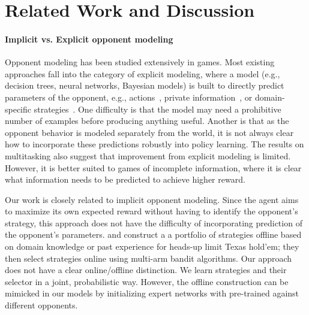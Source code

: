 \section{Related Work and Discussion}
\label{sec:related_work}
\paragraph{Implicit vs. Explicit opponent modeling}

Opponent modeling has been studied extensively in games.  Most existing approaches fall into the category of explicit modeling, where a model (e.g., decision trees, neural networks, Bayesian models) is built to directly predict parameters of the opponent, e.g., actions~\cite{opponent-qlearning,game-theory-opponent-modeling}, private information~\cite{poker-opp,scrabble-opp}, or domain-specific strategies~\cite{schadd07opponentmodeling,bayesbluff}.  One difficulty is that the model may need a prohibitive number of examples before producing anything useful.  Another is that as the opponent behavior is modeled separately from the world, it is not always clear how to incorporate these predictions robustly into policy learning.  The results on multitasking \dron{} also suggest that improvement from explicit modeling is limited.  However, it is better suited to games of incomplete information, where it is clear what information needs to be predicted to achieve higher reward.

Our work is closely related to implicit opponent modeling.  Since the
agent aims to maximize its own expected reward without having to
identify the opponent's strategy, this approach does not have the
difficulty of incorporating
prediction of the opponent's parameters.  \citet{rubin11expert-imitator} and \citet{bard13implicit-modeling} construct a
a portfolio of strategies offline based on
domain knowledge or past experience for heads-up limit Texas hold'em; they then select strategies
online using multi-arm bandit algorithms.
Our approach does not have a clear online/offline distinction.
We learn strategies and their selector in a joint, probabilistic way.
However, the offline construction can be mimicked in our models by initializing expert networks with
\dqn{} pre-trained against different opponents.


